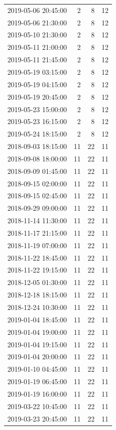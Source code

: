 \begin{tabular}{lrrr}
2019-05-06 20:45:00 & 2 & 8 & 12 \\
2019-05-06 21:30:00 & 2 & 8 & 12 \\
2019-05-10 21:30:00 & 2 & 8 & 12 \\
2019-05-11 21:00:00 & 2 & 8 & 12 \\
2019-05-11 21:45:00 & 2 & 8 & 12 \\
2019-05-19 03:15:00 & 2 & 8 & 12 \\
2019-05-19 04:15:00 & 2 & 8 & 12 \\
2019-05-19 20:45:00 & 2 & 8 & 12 \\
2019-05-23 15:00:00 & 2 & 8 & 12 \\
2019-05-23 16:15:00 & 2 & 8 & 12 \\
2019-05-24 18:15:00 & 2 & 8 & 12 \\
2018-09-03 18:15:00 & 11 & 22 & 11 \\
2018-09-08 18:00:00 & 11 & 22 & 11 \\
2018-09-09 01:45:00 & 11 & 22 & 11 \\
2018-09-15 02:00:00 & 11 & 22 & 11 \\
2018-09-15 02:45:00 & 11 & 22 & 11 \\
2018-09-29 09:00:00 & 11 & 22 & 11 \\
2018-11-14 11:30:00 & 11 & 22 & 11 \\
2018-11-17 21:15:00 & 11 & 22 & 11 \\
2018-11-19 07:00:00 & 11 & 22 & 11 \\
2018-11-22 18:45:00 & 11 & 22 & 11 \\
2018-11-22 19:15:00 & 11 & 22 & 11 \\
2018-12-05 01:30:00 & 11 & 22 & 11 \\
2018-12-18 18:15:00 & 11 & 22 & 11 \\
2018-12-24 10:30:00 & 11 & 22 & 11 \\
2019-01-04 18:45:00 & 11 & 22 & 11 \\
2019-01-04 19:00:00 & 11 & 22 & 11 \\
2019-01-04 19:15:00 & 11 & 22 & 11 \\
2019-01-04 20:00:00 & 11 & 22 & 11 \\
2019-01-10 04:45:00 & 11 & 22 & 11 \\
2019-01-19 06:45:00 & 11 & 22 & 11 \\
2019-01-19 16:00:00 & 11 & 22 & 11 \\
2019-03-22 10:45:00 & 11 & 22 & 11 \\
2019-03-23 20:45:00 & 11 & 22 & 11 \\

\end{tabular}
